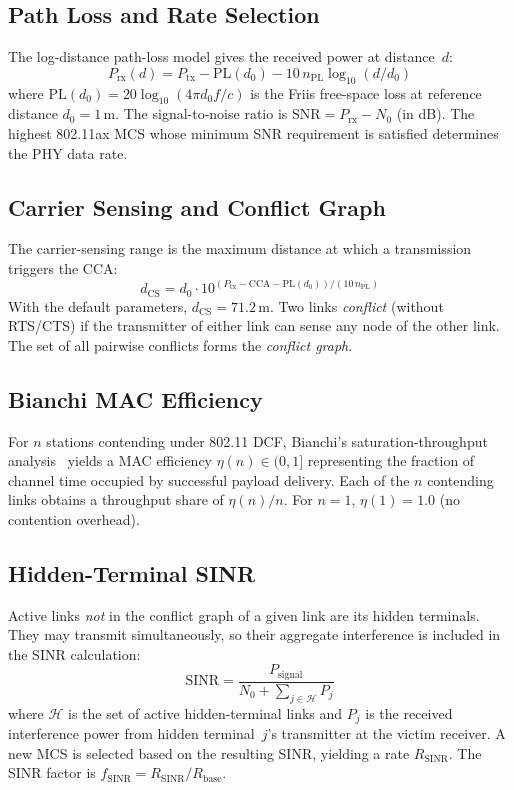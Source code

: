\documentclass[11pt,a4paper]{article}
\begin{document}
\subsection{Path Loss and Rate Selection}

The log-distance path-loss model gives the received power at distance~$d$:
\begin{equation}
    P_{\text{rx}}(d) = P_{\text{tx}} - \text{PL}(d_0) - 10\, n_{\text{PL}} \log_{10}(d/d_0)
\end{equation}
where $\text{PL}(d_0) = 20\log_{10}(4\pi d_0 f/c)$ is the Friis free-space loss at reference distance $d_0 = 1\,$m. The signal-to-noise ratio is $\text{SNR} = P_{\text{rx}} - N_0$ (in dB). The highest 802.11ax MCS whose minimum SNR requirement is satisfied determines the PHY data rate.

\subsection{Carrier Sensing and Conflict Graph}

The carrier-sensing range is the maximum distance at which a transmission triggers the CCA:
\begin{equation}
    d_{\text{CS}} = d_0 \cdot 10^{(P_{\text{tx}} - \text{CCA} - \text{PL}(d_0)) / (10 \, n_{\text{PL}})}
\end{equation}
With the default parameters, $d_{\text{CS}} = 71.2\,$m. Two links \emph{conflict} (without RTS/CTS) if the transmitter of either link can sense any node of the other link. The set of all pairwise conflicts forms the \emph{conflict graph}.

\subsection{Bianchi MAC Efficiency}

For $n$ stations contending under 802.11 DCF, Bianchi's saturation-throughput analysis~\cite{bianchi2000} yields a MAC efficiency $\eta(n) \in (0,1]$ representing the fraction of channel time occupied by successful payload delivery. Each of the $n$ contending links obtains a throughput share of $\eta(n)/n$. For $n=1$, $\eta(1)=1.0$ (no contention overhead).

\subsection{Hidden-Terminal SINR}

Active links \emph{not} in the conflict graph of a given link are its hidden terminals. They may transmit simultaneously, so their aggregate interference is included in the SINR calculation:
\begin{equation}
    \text{SINR} = \frac{P_{\text{signal}}}{N_0 + \sum_{j \in \mathcal{H}} P_j}
\end{equation}
where $\mathcal{H}$ is the set of active hidden-terminal links and $P_j$ is the received interference power from hidden terminal~$j$'s transmitter at the victim receiver. A new MCS is selected based on the resulting SINR, yielding a rate $R_{\text{SINR}}$. The SINR factor is $f_{\text{SINR}} = R_{\text{SINR}} / R_{\text{base}}$.
\end{document}
